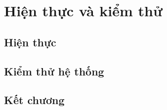 \section{Hiện thực và kiểm thử}
\subsection{Hiện thực}
\subsection{Kiểm thử hệ thống}
\subsection{Kết chương}